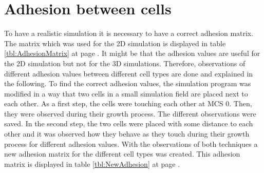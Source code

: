 \section{Adhesion between cells}\label{sec:AdhesionMatrix}
To have a realistic simulation it is necessary to have a correct adhesion matrix. The matrix which was used for the 2D simulation is displayed in table \ref{tbl:AdhesionMatrix} at page \pageref{tbl:AdhesionMatrix}. It might be that the adhesion values are useful for the 2D simulation but not for the 3D simulations. Therefore, observations of different adhesion values between different cell types are done and explained in the following. \newline
To find the correct adhesion values, the simulation program was modified in a way that two cells in a small simulation field are placed next to each other. As a first step, the cells were touching each other at \ac{MCS} 0. Then, they were observed during their growth process. The different observations were saved. In the second step, the two cells were placed with some distance to each other and it was observed how they behave as they touch during their growth process for different adhesion values. \newline
With the observations of both techniques a new adhesion matrix for the different cell types was created. This adhesion matrix is displayed in table \ref{tbl:NewAdhesion} at page \pageref{tbl:NewAdhesion}.

